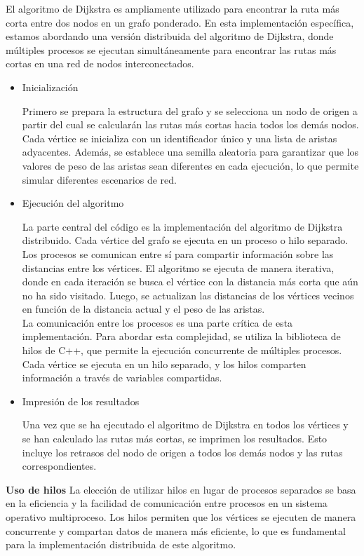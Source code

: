 \documentclass[a4paper,12pt]{article}
\begin{document}
El algoritmo de Dijkstra es ampliamente utilizado para encontrar la ruta más corta entre dos nodos en un grafo ponderado. En esta implementación específica, estamos abordando una versión distribuida del algoritmo de Dijkstra, donde múltiples procesos se ejecutan simultáneamente para encontrar las rutas más cortas en una red de nodos interconectados.


\begin{itemize}
    \item Inicialización

    Primero se prepara la estructura del grafo y se selecciona un nodo de origen a partir del cual se calcularán las rutas más cortas hacia todos los demás nodos. Cada vértice se inicializa con un identificador único y una lista de aristas adyacentes. Además, se establece una semilla aleatoria para garantizar que los valores de peso de las aristas sean diferentes en cada ejecución, lo que permite simular diferentes escenarios de red.

    \item Ejecución del algoritmo

    La parte central del código es la implementación del algoritmo de Dijkstra distribuido. Cada vértice del grafo se ejecuta en un proceso o hilo separado. Los procesos se comunican entre sí para compartir información sobre las distancias entre los vértices. El algoritmo se ejecuta de manera iterativa, donde en cada iteración se busca el vértice con la distancia más corta que aún no ha sido visitado. Luego, se actualizan las distancias de los vértices vecinos en función de la distancia actual y el peso de las aristas. \\

    La comunicación entre los procesos es una parte crítica de esta implementación. Para abordar esta complejidad, se utiliza la biblioteca de hilos de C++, que permite la ejecución concurrente de múltiples procesos. Cada vértice se ejecuta en un hilo separado, y los hilos comparten información a través de variables compartidas.

    \item Impresión de los resultados

    Una vez que se ha ejecutado el algoritmo de Dijkstra en todos los vértices y se han calculado las rutas más cortas, se imprimen los resultados. Esto incluye los retrasos del nodo de origen a todos los demás nodos y las rutas correspondientes.
\end{itemize}


\textbf{Uso de hilos} La elección de utilizar hilos en lugar de procesos separados se basa en la eficiencia y la facilidad de comunicación entre procesos en un sistema operativo multiproceso. Los hilos permiten que los vértices se ejecuten de manera concurrente y compartan datos de manera más eficiente, lo que es fundamental para la implementación distribuida de este algoritmo. \\
\end{document}
